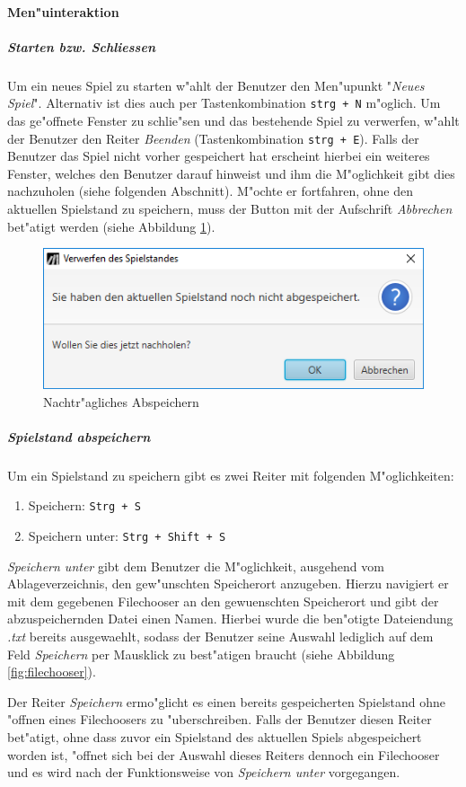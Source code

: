 \paragraph{Men"uinteraktion}
\subparagraph{Starten bzw. Schliessen}
Um ein neues Spiel zu starten w"ahlt der Benutzer den Men"upunkt "\emph{Neues Spiel}". Alternativ ist dies auch per Tastenkombination \verb|strg + N| m"oglich. Um das ge"offnete Fenster zu schlie"sen und das bestehende Spiel zu verwerfen, w"ahlt der Benutzer den Reiter \emph{Beenden} (Tastenkombination \verb|strg + E|). Falls der Benutzer das Spiel nicht vorher gespeichert hat erscheint hierbei ein weiteres Fenster, welches den Benutzer darauf hinweist und ihm die M"oglichkeit gibt dies nachzuholen (siehe folgenden Abschnitt). M"ochte er fortfahren, ohne den aktuellen Spielstand zu speichern, muss der Button mit der Aufschrift \emph{Abbrechen} bet"atigt werden (siehe Abbildung \ref{fig:nachtrSpeichern}). 

\begin{figure}
	\centering
	\includegraphics[width=.6\linewidth]{screenshots/screenshot_NachtraeglichesAbspeichern}
	\caption{Nachtr"agliches Abspeichern}
	\label{fig:nachtrSpeichern}
\end{figure}

\subparagraph{Spielstand abspeichern}
\label{spar:anleitung_speichern}
Um ein Spielstand zu speichern gibt es zwei Reiter mit folgenden M"oglichkeiten:
\begin{enumerate}
	\item Speichern: \verb|Strg + S|
	\item Speichern unter: \verb|Strg + Shift + S|
\end{enumerate}
\emph{Speichern unter} gibt dem Benutzer die M"oglichkeit, ausgehend vom Ablageverzeichnis, den gew"unschten Speicherort anzugeben. Hierzu navigiert er mit dem gegebenen Filechooser an den gewuenschten Speicherort und gibt der abzuspeichernden Datei einen Namen. Hierbei wurde die ben"otigte Dateiendung \emph{.txt} bereits ausgewaehlt, sodass der Benutzer seine Auswahl lediglich auf dem Feld \emph{Speichern} per Mausklick zu best"atigen braucht (siehe Abbildung \ref{fig:filechooser}). 

Der Reiter \emph{Speichern} ermo"glicht es einen bereits gespeicherten Spielstand ohne "offnen eines Filechoosers zu "uberschreiben. Falls der Benutzer diesen Reiter bet"atigt, ohne dass zuvor ein Spielstand des aktuellen Spiels abgespeichert worden ist, "offnet sich bei der Auswahl dieses Reiters dennoch ein Filechooser und es wird nach der Funktionsweise von \emph{Speichern unter} vorgegangen.

